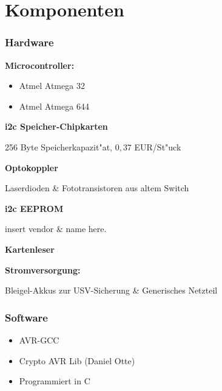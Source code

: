 %

\section{Komponenten}
\begin{frame}
	\frametitle{Hardware}
	\textbf{Microcontroller:}
	\begin{itemize}
		\item Atmel Atmega 32
		\item Atmel Atmega 644
	\end{itemize}
	\par
	\textbf{i2c Speicher-Chipkarten} \begin{small}256 Byte Speicherkapazit"at, $0,37$ EUR/St"uck\end{small}
	\par
	\textbf{Optokoppler} \begin{small}Laserdioden \& Fototransistoren aus altem Switch\end{small}
	\par
	\textbf{i2c EEPROM} \begin{small}insert vendor \& name here.\end{small}
	\par
	\textbf{Kartenleser}
	\par
	\textbf{Stromversorgung:}\begin{small}Bleigel-Akkus zur USV-Sicherung \& Generisches Netzteil\end{small}
\end{frame}

\begin{frame}
	\frametitle{Software}
	\begin{itemize}
		\item AVR-GCC
		\item Crypto AVR Lib (Daniel Otte)
		\item Programmiert in C
	\end{itemize}
\end{frame}





